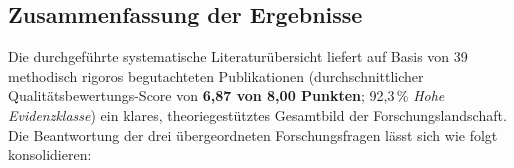 \subsection{Zusammenfassung der Ergebnisse}
\label{subsec:zusammenfassung_ergebnisse}

Die durchgeführte systematische Literaturübersicht liefert auf Basis von 39 methodisch rigoros begutachteten Publikationen (durchschnittlicher Qualitätsbewertungs-Score von \textbf{6,87 von 8,00 Punkten}; 92,3\,\% \textit{Hohe Evidenzklasse}) ein klares, theoriegestütztes Gesamtbild der Forschungslandschaft. Die Beantwortung der drei übergeordneten Forschungsfragen lässt sich wie folgt konsolidieren:

